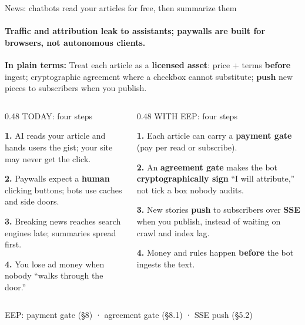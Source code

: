 \documentclass[aspectratio=169,10pt]{beamer}
\begin{document}
\begin{frame}{News: chatbots read your articles for free, then summarize them}
\framesubtitle{Traffic and attribution leak to assistants; paywalls are built for browsers, not autonomous clients.}

\vspace{0.08cm}
{\small\color{amber}\textbf{In plain terms:}\; Treat each article as a \textbf{licensed asset}: price + terms \textbf{before} ingest; cryptographic agreement where a checkbox cannot substitute; \textbf{push} new pieces to subscribers when you publish.}

\vspace{0.08cm}
\begin{columns}[T]
\begin{column}{0.48\textwidth}
{\small\color{rose} TODAY: four steps}\par
\vspace{2pt}
{\small\color{txtm}%
\textbf{1.}\; AI reads your article and hands users the gist; your site may never get the click.\par
\textbf{2.}\; Paywalls expect a \textbf{human} clicking buttons; bots use caches and side doors.\par
\textbf{3.}\; Breaking news reaches search engines late; summaries spread first.\par
\textbf{4.}\; You lose ad money when nobody ``walks through the door.''\par
}
\end{column}

\begin{column}{0.48\textwidth}
{\small\color{mint} WITH EEP: four steps}\par
\vspace{2pt}
{\small\color{txtm}%
\textbf{1.}\; Each article can carry a \textbf{payment gate} (pay per read or subscribe).\par
\textbf{2.}\; An \textbf{agreement gate} makes the bot \textbf{cryptographically sign} ``I will attribute,'' not tick a box nobody audits.\par
\textbf{3.}\; New stories \textbf{push} to subscribers over \textbf{SSE} when you publish, instead of waiting on crawl and index lag.\par
\textbf{4.}\; Money and rules happen \textbf{before} the bot ingests the text.\par
}
\end{column}
\end{columns}

\vspace{4pt}
{\footnotesize\color{slate} EEP: payment gate (§8) · agreement gate (§8.1) · SSE push (§5.2)}
\end{frame}
\end{document}
